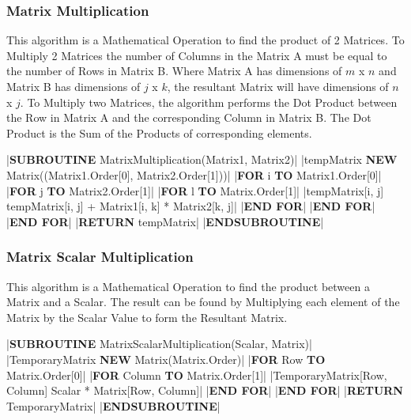 \begin{flushleft}
                \vspace{0.5cm}
            \subsubsection{Matrix Multiplication}
                This algorithm is a Mathematical Operation to find the product of 2 Matrices. To Multiply 2 Matrices
                the number of Columns in the Matrix A must be equal to the number of Rows in Matrix B. Where Matrix A has
                dimensions of $m$ x $n$ and Matrix B has dimensions of $j$ x $k$, the resultant Matrix will have dimensions of 
                $n$ x $j$. To Multiply two Matrices, the algorithm performs the Dot Product between the Row in Matrix A and the 
                corresponding Column in Matrix B. The Dot Product is the Sum of the Products of corresponding elements.

                \vspace{0.2cm}
                \begin{pseudocode}
|\textbf{SUBROUTINE} MatrixMultiplication(Matrix1, Matrix2)|
    |tempMatrix \leftarrow \textbf{NEW} Matrix((Matrix1.Order[0], Matrix2.Order[1]))|
    |\textbf{FOR} i  \textbf{TO} Matrix1.Order[0]|
        |\textbf{FOR} j  \textbf{TO} Matrix2.Order[1]|
            |\textbf{FOR} l  \textbf{TO} Matrix.Order[1]|
                |tempMatrix[i, j] \leftarrow tempMatrix[i, j] + Matrix1[i, k] * Matrix2[k, j]|
            |\textbf{END FOR}|
        |\textbf{END FOR}|
    |\textbf{END FOR}|
    |\textbf{RETURN} tempMatrix|
|\textbf{ENDSUBROUTINE}|
                \end{pseudocode}   

                \vspace{0.5cm}
            \subsubsection{Matrix Scalar Multiplication}
                This algorithm is a Mathematical Operation to find the product between a Matrix and a Scalar.
                The result can be found by Multiplying each element of the Matrix by the Scalar Value to form the Resultant 
                Matrix.

                \vspace{0.2cm}
                \begin{pseudocode}
|\textbf{SUBROUTINE} MatrixScalarMultiplication(Scalar, Matrix)|
    |TemporaryMatrix \leftarrow \textbf{NEW} Matrix(Matrix.Order)|
    |\textbf{FOR} Row  \textbf{TO} Matrix.Order[0]|
        |\textbf{FOR} Column  \textbf{TO} Matrix.Order[1]|
            |TemporaryMatrix[Row, Column] \leftarrow Scalar * Matrix[Row, Column]|
        |\textbf{END FOR}|
    |\textbf{END FOR}|
    |\textbf{RETURN} TemporaryMatrix|
|\textbf{ENDSUBROUTINE}|
                \end{pseudocode}   
                

\end{flushleft}

